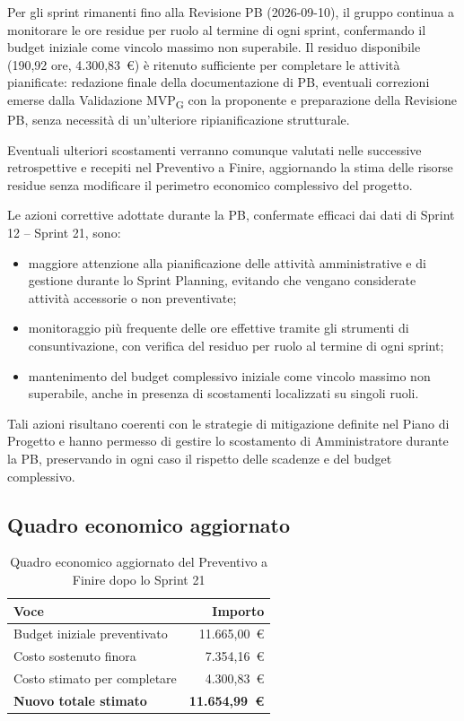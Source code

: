 Per gli sprint rimanenti fino alla Revisione PB (2026-09-10), il gruppo
continua a monitorare le ore residue per ruolo al termine di ogni sprint,
confermando il budget iniziale come vincolo massimo non superabile. Il
residuo disponibile (190,92 ore, 4.300,83~\euro) è ritenuto sufficiente per
completare le attività pianificate: redazione finale della documentazione
di PB, eventuali correzioni emerse dalla Validazione MVP\textsubscript{G} con
la proponente e preparazione della Revisione PB, senza necessità di
un'ulteriore ripianificazione strutturale.

Eventuali ulteriori scostamenti verranno comunque valutati nelle successive
retrospettive e recepiti nel Preventivo a Finire, aggiornando la stima delle
risorse residue senza modificare il perimetro economico complessivo del progetto.

Le azioni correttive adottate durante la PB, confermate efficaci dai dati di
Sprint 12 -- Sprint 21, sono:
\begin{itemize}
    \item maggiore attenzione alla pianificazione delle attività amministrative e
    di gestione durante lo Sprint Planning, evitando che vengano considerate
    attività accessorie o non preventivate;
    \item monitoraggio più frequente delle ore effettive tramite gli strumenti di
    consuntivazione, con verifica del residuo per ruolo al termine di ogni sprint;
    \item mantenimento del budget complessivo iniziale come vincolo massimo non
    superabile, anche in presenza di scostamenti localizzati su singoli ruoli.
\end{itemize}

Tali azioni risultano coerenti con le strategie di mitigazione definite nel
Piano di Progetto e hanno permesso di gestire lo scostamento di
Amministratore durante la PB, preservando in ogni caso il rispetto delle
scadenze e del budget complessivo.

\subsection{Quadro economico aggiornato}

\begin{table}[H]
\centering
\renewcommand{\arraystretch}{1.3}
\begin{tabular}{l r}
\toprule
\textbf{Voce} & \textbf{Importo} \\
\midrule
Budget iniziale preventivato  & 11.665{,}00~\euro \\
Costo sostenuto finora        & 7.354{,}16~\euro \\
Costo stimato per completare  & 4.300{,}83~\euro \\
\midrule
\textbf{Nuovo totale stimato} & \textbf{11.654{,}99~\euro} \\
\bottomrule
\end{tabular}
\caption{Quadro economico aggiornato del Preventivo a Finire dopo lo Sprint 21}
\end{table}

